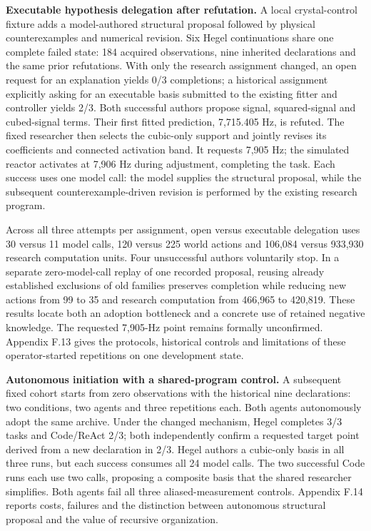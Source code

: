 \documentclass[11pt,a4paper]{article}
\begin{document}
\textbf{Executable hypothesis delegation after refutation.} A local crystal-control fixture adds a model-authored structural proposal followed by physical counterexamples and numerical revision. Six Hegel continuations share one complete failed state: 184 acquired observations, nine inherited declarations and the same prior refutations. With only the research assignment changed, an open request for an explanation yields 0/3 completions; a historical assignment explicitly asking for an executable basis submitted to the existing fitter and controller yields 2/3. Both successful authors propose signal, squared-signal and cubed-signal terms. Their first fitted prediction, 7,715.405 Hz, is refuted. The fixed researcher then selects the cubic-only support and jointly revises its coefficients and connected activation band. It requests 7,905 Hz; the simulated reactor activates at 7,906 Hz during adjustment, completing the task. Each success uses one model call: the model supplies the structural proposal, while the subsequent counterexample-driven revision is performed by the existing research program.


Across all three attempts per assignment, open versus executable delegation uses 30 versus 11 model calls, 120 versus 225 world actions and 106,084 versus 933,930 research computation units. Four unsuccessful authors voluntarily stop. In a separate zero-model-call replay of one recorded proposal, reusing already established exclusions of old families preserves completion while reducing new actions from 99 to 35 and research computation from 466,965 to 420,819. These results locate both an adoption bottleneck and a concrete use of retained negative knowledge. The requested 7,905-Hz point remains formally unconfirmed. Appendix F.13 gives the protocols, historical controls and limitations of these operator-started repetitions on one development state.


\textbf{Autonomous initiation with a shared-program control.} A subsequent fixed cohort starts from zero observations with the historical nine declarations: two conditions, two agents and three repetitions each. Both agents autonomously adopt the same archive. Under the changed mechanism, Hegel completes 3/3 tasks and Code/ReAct 2/3; both independently confirm a requested target point derived from a new declaration in 2/3. Hegel authors a cubic-only basis in all three runs, but each success consumes all 24 model calls. The two successful Code runs each use two calls, proposing a composite basis that the shared researcher simplifies. Both agents fail all three aliased-measurement controls. Appendix F.14 reports costs, failures and the distinction between autonomous structural proposal and the value of recursive organization.
\end{document}
